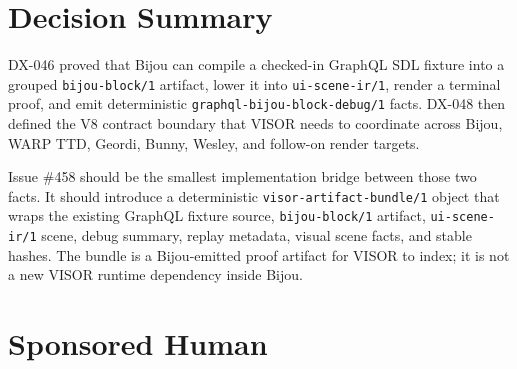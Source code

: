 \section{Decision Summary}\label{record-145-decision-summary}

DX-046 proved that Bijou can compile a checked-in GraphQL SDL fixture into a grouped \texttt{b\allowbreak{}i\allowbreak{}j\allowbreak{}o\allowbreak{}u\allowbreak{}-\allowbreak{}b\allowbreak{}l\allowbreak{}o\allowbreak{}c\allowbreak{}k\allowbreak{}/\allowbreak{}1} artifact, lower it into \texttt{u\allowbreak{}i\allowbreak{}-\allowbreak{}s\allowbreak{}c\allowbreak{}e\allowbreak{}n\allowbreak{}e\allowbreak{}-\allowbreak{}i\allowbreak{}r\allowbreak{}/\allowbreak{}1}, render a terminal proof, and emit deterministic \texttt{g\allowbreak{}r\allowbreak{}a\allowbreak{}p\allowbreak{}h\allowbreak{}q\allowbreak{}l\allowbreak{}-\allowbreak{}b\allowbreak{}i\allowbreak{}j\allowbreak{}o\allowbreak{}u\allowbreak{}-\allowbreak{}b\allowbreak{}l\allowbreak{}o\allowbreak{}c\allowbreak{}k\allowbreak{}-\allowbreak{}d\allowbreak{}e\allowbreak{}b\allowbreak{}u\allowbreak{}g\allowbreak{}/\allowbreak{}1} facts. DX-048 then defined the V8 contract boundary that VISOR needs to coordinate across Bijou, WARP TTD, Geordi, Bunny, Wesley, and follow-on render targets.

Issue \#458 should be the smallest implementation bridge between those two facts. It should introduce a deterministic \texttt{v\allowbreak{}i\allowbreak{}s\allowbreak{}o\allowbreak{}r\allowbreak{}-\allowbreak{}a\allowbreak{}r\allowbreak{}t\allowbreak{}i\allowbreak{}f\allowbreak{}a\allowbreak{}c\allowbreak{}t\allowbreak{}-\allowbreak{}b\allowbreak{}u\allowbreak{}n\allowbreak{}d\allowbreak{}l\allowbreak{}e\allowbreak{}/\allowbreak{}1} object that wraps the existing GraphQL fixture source, \texttt{b\allowbreak{}i\allowbreak{}j\allowbreak{}o\allowbreak{}u\allowbreak{}-\allowbreak{}b\allowbreak{}l\allowbreak{}o\allowbreak{}c\allowbreak{}k\allowbreak{}/\allowbreak{}1} artifact, \texttt{u\allowbreak{}i\allowbreak{}-\allowbreak{}s\allowbreak{}c\allowbreak{}e\allowbreak{}n\allowbreak{}e\allowbreak{}-\allowbreak{}i\allowbreak{}r\allowbreak{}/\allowbreak{}1} scene, debug summary, replay metadata, visual scene facts, and stable hashes. The bundle is a Bijou-emitted proof artifact for VISOR to index; it is not a new VISOR runtime dependency inside Bijou.

\section{Sponsored Human}\label{record-145-sponsored-human}

